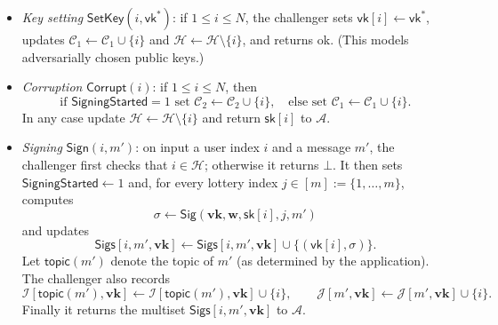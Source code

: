 \documentclass{article}
\newcommand{\sk}[0]{\mathsf{sk}}
\newcommand{\vk}[0]{\mathsf{vk}}
\begin{document}
\begin{enumerate}
\begin{itemize}
          \item \emph{Key setting} $\mathsf{SetKey}(i,\vk^\ast)$:
                if $1 \le i \le N$, the challenger sets
                $\vk[i] \gets \vk^\ast$,
                updates $\mathcal{C}_1 \gets \mathcal{C}_1 \cup \{i\}$ and
                $\mathcal{H} \gets \mathcal{H} \setminus \{i\}$,
                and returns \textsf{ok}.
                (This models adversarially chosen public keys.)

          \item \emph{Corruption} $\mathsf{Corrupt}(i)$:
                if $1 \le i \le N$, then
                \[
                  \text{if } \mathsf{SigningStarted} = 1
                  \text{ set } \mathcal{C}_2 \gets \mathcal{C}_2 \cup \{i\},
                  \quad
                  \text{else set } \mathcal{C}_1 \gets \mathcal{C}_1 \cup \{i\}.
                \]
                In any case update
                $\mathcal{H} \gets \mathcal{H} \setminus \{i\}$
                and return $\sk[i]$ to $\mathcal{A}$.

          \item \emph{Signing} $\mathsf{Sign}(i,m')$:
                on input a user index $i$ and a message $m'$, the challenger
                first checks that $i \in \mathcal{H}$; otherwise it returns
                $\bot$.
                It then sets $\mathsf{SigningStarted} \gets 1$ and, for every
                lottery index $j \in [m] := \{1,\dots,m\}$, computes
                \[
                  \sigma \leftarrow
                    \mathsf{Sig}(\mathbf{vk},\mathbf{w},\sk[i],j,m')
                \]
                and updates
                \[
                  \mathsf{Sigs}[i,m',\mathbf{vk}]
                    \gets
                    \mathsf{Sigs}[i,m',\mathbf{vk}]
                    \cup \{(\vk[i],\sigma)\}.
                \]
                Let $\mathsf{topic}(m')$ denote the topic of $m'$
                (as determined by the application).
                The challenger also records
                \[
                  \mathcal{I}[\mathsf{topic}(m'),\mathbf{vk}]
                    \gets
                    \mathcal{I}[\mathsf{topic}(m'),\mathbf{vk}] \cup \{i\},
                  \qquad
                  \mathcal{J}[m',\mathbf{vk}]
                    \gets
                    \mathcal{J}[m',\mathbf{vk}] \cup \{i\}.
                \]
                Finally it returns the multiset
                $\mathsf{Sigs}[i,m',\mathbf{vk}]$ to $\mathcal{A}$.
        \end{itemize}


\end{enumerate}
\end{document}
